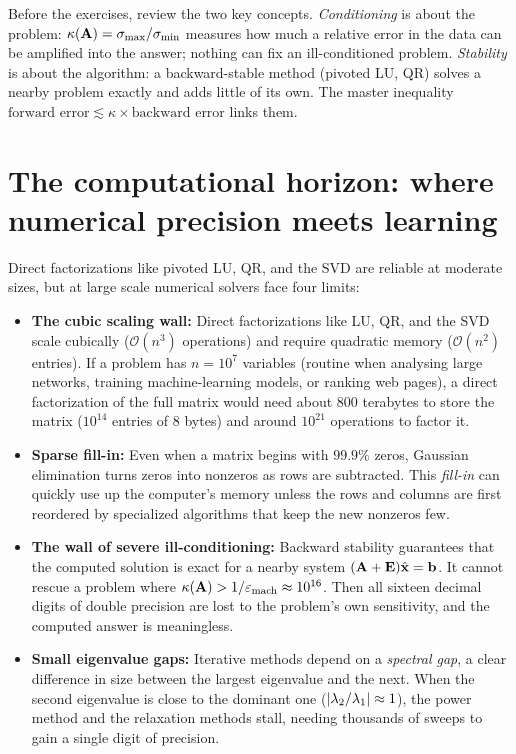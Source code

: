 \begin{recoverybox}
Before the exercises, review the two key concepts. \emph{Conditioning} is about the problem:
$\kappa(\mathbf{A})=\sigma_{\max}/\sigma_{\min}$ measures how much a relative error in the
data can be amplified into the answer; nothing can fix an ill-conditioned problem.
\emph{Stability} is about the algorithm: a backward-stable method (pivoted LU, QR)
solves a nearby problem exactly and adds little of its own. The master inequality
$\text{forward error}\lesssim\kappa\times\text{backward error}$ links them.
\end{recoverybox}

\section{The computational horizon: where numerical precision meets learning}

Direct factorizations like pivoted LU, QR, and the SVD are reliable at moderate
sizes, but at large scale numerical solvers face four limits:

\begin{itemize}
  \item \textbf{The cubic scaling wall:} Direct factorizations like LU, QR, and the SVD
    scale cubically ($\mathcal{O}(n^3)$ operations) and require quadratic memory
    ($\mathcal{O}(n^2)$ entries). If a problem has $n = 10^7$ variables (routine when
    analysing large networks, training machine-learning models, or ranking web pages), a
    direct factorization of the full matrix
    would need about $800$ terabytes to store the matrix ($10^{14}$ entries of $8$
    bytes) and around $10^{21}$ operations to factor it.
  \item \textbf{Sparse fill-in:} Even when a matrix begins with $99.9\%$ zeros, Gaussian
    elimination turns zeros into nonzeros as rows are subtracted. This
    \emph{fill-in} can quickly use up the computer's memory unless the rows and columns
    are first reordered by specialized algorithms that keep the new nonzeros few.
  \item \textbf{The wall of severe ill-conditioning:} Backward stability guarantees that the
    computed solution is exact for a nearby system $(\mathbf{A}+\mathbf{E})\hat{\mathbf{x}}=\mathbf{b}$.
    It cannot rescue a problem where $\kappa(\mathbf{A}) > 1/\varepsilon_{\text{mach}} \approx 10^{16}$.
    Then all sixteen decimal digits of double precision are lost to the problem's own
    sensitivity, and the computed answer is meaningless.
  \item \textbf{Small eigenvalue gaps:} Iterative methods depend on a \emph{spectral
    gap}, a clear difference in size between the largest eigenvalue and the next. When
    the second eigenvalue is close to the dominant one ($\lvert\lambda_2/\lambda_1\rvert
    \approx 1$), the power method and the relaxation methods stall, needing thousands of
    sweeps to gain a single digit of precision.
\end{itemize}


